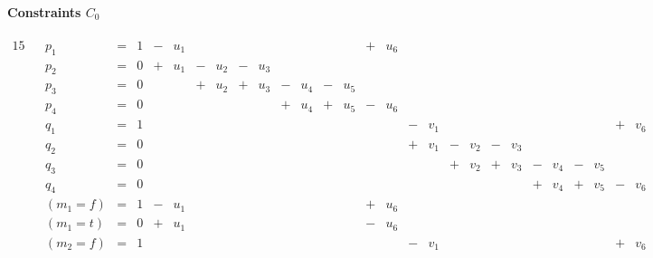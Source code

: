 \documentclass{article}
\begin{document}
\paragraph{Constraints $C_0$}

\begin{alignat*}{15}
&& p_1 &{}={}& 1
  &{}-{}& u_1 &     &     &     &     &     &     &     &     &{}+{}& u_6 
  &     &     &     &     &     &     &     &     &     &     &     &     \\
&& p_2 &{}={}& 0
  &{}+{}& u_1 &{}-{}& u_2 &{}-{}& u_3 &     &     &     &     &     &     
  &     &     &     &     &     &     &     &     &     &     &     &     \\
&& p_3 &{}={}& 0
  &     &     &{}+{}& u_2 &{}+{}& u_3 &{}-{}& u_4 &{}-{}& u_5 &     &     
  &     &     &     &     &     &     &     &     &     &     &     &     \\
&& p_4 &{}={}& 0
  &     &     &     &     &     &     &{}+{}& u_4 &{}+{}& u_5 &{}-{}& u_6
  &     &     &     &     &     &     &     &     &     &     &     &     \\
&& q_1 &{}={}& 1
  &     &     &     &     &     &     &     &     &     &     &     &     
  &{}-{}& v_1 &     &     &     &     &     &     &     &     &{}+{}& v_6 \\
&& q_2 &{}={}& 0
  &     &     &     &     &     &     &     &     &     &     &     &    
  &{}+{}& v_1 &{}-{}& v_2 &{}-{}& v_3 &     &     &     &     &     &     \\
&& q_3 &{}={}& 0
  &     &     &     &     &     &     &     &     &     &     &     &     
  &     &     &{}+{}& v_2 &{}+{}& v_3 &{}-{}& v_4 &{}-{}& v_5 &     &     \\
&& q_4 &{}={}& 0
  &     &     &     &     &     &     &     &     &     &     &     &     
  &     &     &     &     &     &     &{}+{}& v_4 &{}+{}& v_5 &{}-{}& v_6 \\
&& (m_1=f) &{}={}& 1
  &{}-{}& u_1 &     &     &     &     &     &     &     &     &{}+{}& u_6     
  &     &     &     &     &     &     &     &     &     &     &     &     \\
&& (m_1=t) &{}={}& 0
  &{}+{}& u_1 &     &     &     &     &     &     &     &     &{}-{}& u_6     
  &     &     &     &     &     &     &     &     &     &     &     &     \\
&& (m_2=f) &{}={}& 1
  &     &     &     &     &     &     &     &     &     &     &     &     
  &{}-{}& v_1 &     &     &     &     &     &     &     &     &{}+{}& v_6 \\    

\end{alignat*}
\end{document}

